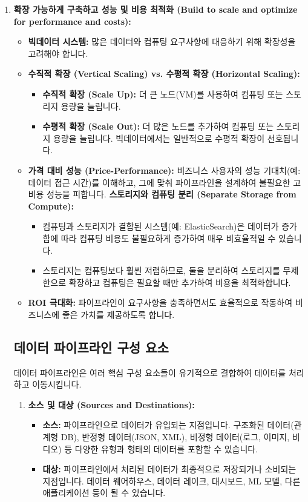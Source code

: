 \documentclass[11pt,a4paper]{article}
\theoremstyle{definition}
\begin{document}
\begin{enumerate}
    \item \textbf{확장 가능하게 구축하고 성능 및 비용 최적화 (Build to scale and optimize for performance and costs):}
    \begin{itemize}
        \item \textbf{빅데이터 시스템:} 많은 데이터와 컴퓨팅 요구사항에 대응하기 위해 확장성을 고려해야 합니다.
        \item \textbf{수직적 확장 (Vertical Scaling) vs. 수평적 확장 (Horizontal Scaling):}
        \begin{itemize}
            \item \textbf{수직적 확장 (Scale Up):} 더 큰 노드(VM)를 사용하여 컴퓨팅 또는 스토리지 용량을 늘립니다.
            \item \textbf{수평적 확장 (Scale Out):} 더 많은 노드를 추가하여 컴퓨팅 또는 스토리지 용량을 늘립니다. 빅데이터에서는 일반적으로 수평적 확장이 선호됩니다.
        \end{itemize}
        \item \textbf{가격 대비 성능 (Price-Performance):} 비즈니스 사용자의 성능 기대치(예: 데이터 접근 시간)를 이해하고, 그에 맞춰 파이프라인을 설계하여 불필요한 고비용 성능을 피합니다.
        \textbf{스토리지와 컴퓨팅 분리 (Separate Storage from Compute):}
        \begin{itemize}
            \item 컴퓨팅과 스토리지가 결합된 시스템(예: ElasticSearch)은 데이터가 증가함에 따라 컴퓨팅 비용도 불필요하게 증가하여 매우 비효율적일 수 있습니다.
            \item 스토리지는 컴퓨팅보다 훨씬 저렴하므로, 둘을 분리하여 스토리지를 무제한으로 확장하고 컴퓨팅은 필요할 때만 추가하여 비용을 최적화합니다.
        \end{itemize}
        \item \textbf{ROI 극대화:} 파이프라인이 요구사항을 충족하면서도 효율적으로 작동하여 비즈니스에 좋은 가치를 제공하도록 합니다.
    \end{itemize}

\subsection{데이터 파이프라인 구성 요소}

데이터 파이프라인은 여러 핵심 구성 요소들이 유기적으로 결합하여 데이터를 처리하고 이동시킵니다.

\begin{enumerate}
    \item \textbf{소스 및 대상 (Sources and Destinations):}
    \begin{itemize}
        \item \textbf{소스:} 파이프라인으로 데이터가 유입되는 지점입니다. 구조화된 데이터(관계형 DB), 반정형 데이터(JSON, XML), 비정형 데이터(로그, 이미지, 비디오) 등 다양한 유형과 형태의 데이터를 포함할 수 있습니다.
        \item \textbf{대상:} 파이프라인에서 처리된 데이터가 최종적으로 저장되거나 소비되는 지점입니다. 데이터 웨어하우스, 데이터 레이크, 대시보드, ML 모델, 다른 애플리케이션 등이 될 수 있습니다.
    \end{itemize}


\end{enumerate}
\end{enumerate}
\end{document}
